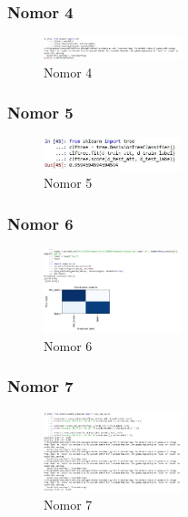 \subsubsection{Nomor 4}
\hfill\break

\begin{figure}[H]
\centering
\includegraphics[width=4cm]{figures/1174066/4/no4.jpg}
\caption{Nomor 4}
\end{figure}

\subsubsection{Nomor 5}
\hfill\break

\begin{figure}[H]
\centering
\includegraphics[width=4cm]{figures/1174066/4/no5.jpg}
\caption{Nomor 5}
\end{figure}

\subsubsection{Nomor 6}
\hfill\break

\begin{figure}[H]
\centering
\includegraphics[width=4cm]{figures/1174066/4/no6.jpg}
\caption{Nomor 6}
\end{figure}

\subsubsection{Nomor 7}
\hfill\break

\begin{figure}[H]
\centering
\includegraphics[width=4cm]{figures/1174066/4/no7.jpg}
\caption{Nomor 7}
\end{figure}

